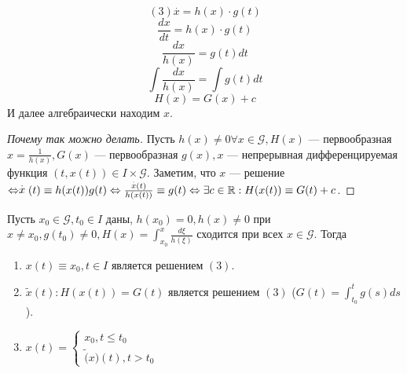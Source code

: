 \begin{example}
    \[(3) \stackrel{.}{x} = h(x) \cdot g(t)\]
    \[\frac{dx}{dt} = h(x) \cdot g(t)\]
    \[\frac{dx}{h(x)} = g(t)dt\]
    \[\int \frac{dx}{h(x)} = \int g(t)dt\]
    \[H(x) = G(x) + c\]
    И далее алгебраически находим \(x\).
\end{example}
\begin{proof}[Почему так можно делать]
    Пусть \(h(x) \ne 0 \forall x \in \mathcal{G}, H(x)\) --- первообразная \(x = \frac{1}{h(x)}, G(x)\) --- первообразная \(g(x), x\) --- непрерывная дифференцируемая функция \((t, x(t)) \in I \times \mathcal{G}\). Заметим, что \(x\) --- решение \(\Leftrightarrow \stackrel{.}{x}(t) \equiv h(x(t)) g(t) \Leftrightarrow \frac{\stackrel{.}{x}(t)}{h(x(t))} \equiv g(t) \Leftrightarrow \exists c \in \mathbb{R}: H(x(t)) \equiv G(t) + c\).

\end{proof}

Пусть \(x_0 \in \mathcal{G}, t_0 \in I\) даны, \(h(x_0) = 0, h(x) \ne 0\) при \(x \ne x_0, g(t_0) \ne 0, H(x) = \int_{x_0}^x \frac{d\xi}{h(\xi)}\) сходится при всех \(x \in \mathcal{G}\). Тогда 
\begin{enumerate}
    \item \(x(t) \equiv x_0, t \in I\) является решением \((3)\).
    
    \item \(\tilde{x}(t): H(x(t)) = G(t)\) является решением \((3)\) (\(G(t) = \int_{t_0}^t g(s)ds\)).
    
    \item \(x(t) = \left\{\begin{array}{l}
        x_0, t \le t_0 \\
        \tilde(x)(t), t > t_0
    \end{array}\right.\)
\end{enumerate}